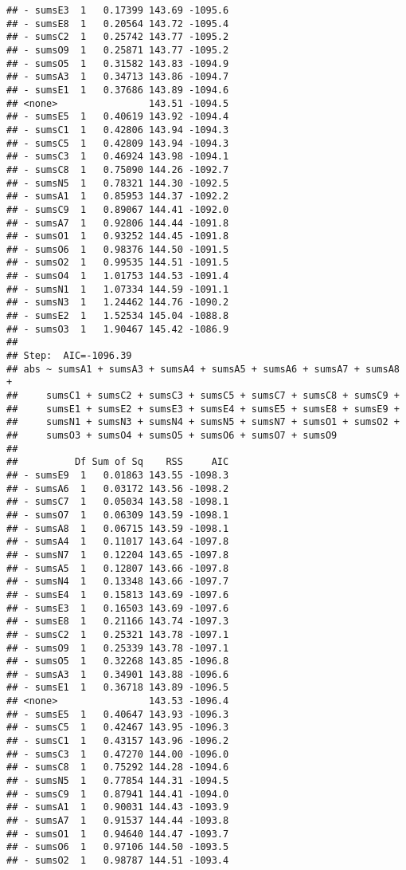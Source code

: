 \documentclass[,man,floatsintext]{apa6}
\begin{document}
\begin{verbatim}
## - sumsE3  1   0.17399 143.69 -1095.6
## - sumsE8  1   0.20564 143.72 -1095.4
## - sumsC2  1   0.25742 143.77 -1095.2
## - sumsO9  1   0.25871 143.77 -1095.2
## - sumsO5  1   0.31582 143.83 -1094.9
## - sumsA3  1   0.34713 143.86 -1094.7
## - sumsE1  1   0.37686 143.89 -1094.6
## <none>                143.51 -1094.5
## - sumsE5  1   0.40619 143.92 -1094.4
## - sumsC1  1   0.42806 143.94 -1094.3
## - sumsC5  1   0.42809 143.94 -1094.3
## - sumsC3  1   0.46924 143.98 -1094.1
## - sumsC8  1   0.75090 144.26 -1092.7
## - sumsN5  1   0.78321 144.30 -1092.5
## - sumsA1  1   0.85953 144.37 -1092.2
## - sumsC9  1   0.89067 144.41 -1092.0
## - sumsA7  1   0.92806 144.44 -1091.8
## - sumsO1  1   0.93252 144.45 -1091.8
## - sumsO6  1   0.98376 144.50 -1091.5
## - sumsO2  1   0.99535 144.51 -1091.5
## - sumsO4  1   1.01753 144.53 -1091.4
## - sumsN1  1   1.07334 144.59 -1091.1
## - sumsN3  1   1.24462 144.76 -1090.2
## - sumsE2  1   1.52534 145.04 -1088.8
## - sumsO3  1   1.90467 145.42 -1086.9
## 
## Step:  AIC=-1096.39
## abs ~ sumsA1 + sumsA3 + sumsA4 + sumsA5 + sumsA6 + sumsA7 + sumsA8 + 
##     sumsC1 + sumsC2 + sumsC3 + sumsC5 + sumsC7 + sumsC8 + sumsC9 + 
##     sumsE1 + sumsE2 + sumsE3 + sumsE4 + sumsE5 + sumsE8 + sumsE9 + 
##     sumsN1 + sumsN3 + sumsN4 + sumsN5 + sumsN7 + sumsO1 + sumsO2 + 
##     sumsO3 + sumsO4 + sumsO5 + sumsO6 + sumsO7 + sumsO9
## 
##          Df Sum of Sq    RSS     AIC
## - sumsE9  1   0.01863 143.55 -1098.3
## - sumsA6  1   0.03172 143.56 -1098.2
## - sumsC7  1   0.05034 143.58 -1098.1
## - sumsO7  1   0.06309 143.59 -1098.1
## - sumsA8  1   0.06715 143.59 -1098.1
## - sumsA4  1   0.11017 143.64 -1097.8
## - sumsN7  1   0.12204 143.65 -1097.8
## - sumsA5  1   0.12807 143.66 -1097.8
## - sumsN4  1   0.13348 143.66 -1097.7
## - sumsE4  1   0.15813 143.69 -1097.6
## - sumsE3  1   0.16503 143.69 -1097.6
## - sumsE8  1   0.21166 143.74 -1097.3
## - sumsC2  1   0.25321 143.78 -1097.1
## - sumsO9  1   0.25339 143.78 -1097.1
## - sumsO5  1   0.32268 143.85 -1096.8
## - sumsA3  1   0.34901 143.88 -1096.6
## - sumsE1  1   0.36718 143.89 -1096.5
## <none>                143.53 -1096.4
## - sumsE5  1   0.40647 143.93 -1096.3
## - sumsC5  1   0.42467 143.95 -1096.3
## - sumsC1  1   0.43157 143.96 -1096.2
## - sumsC3  1   0.47270 144.00 -1096.0
## - sumsC8  1   0.75292 144.28 -1094.6
## - sumsN5  1   0.77854 144.31 -1094.5
## - sumsC9  1   0.87941 144.41 -1094.0
## - sumsA1  1   0.90031 144.43 -1093.9
## - sumsA7  1   0.91537 144.44 -1093.8
## - sumsO1  1   0.94640 144.47 -1093.7
## - sumsO6  1   0.97106 144.50 -1093.5
## - sumsO2  1   0.98787 144.51 -1093.4

\end{verbatim}
\end{document}
